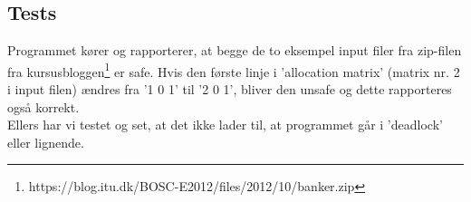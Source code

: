\subsection{Tests}
\label{O4_Tests}
Programmet kører og rapporterer, at begge de to eksempel input filer fra zip-filen fra kursusbloggen\footnote{https://blog.itu.dk/BOSC-E2012/files/2012/10/banker.zip} er safe. Hvis den første linje i 'allocation matrix' (matrix nr. 2 i  input filen) ændres fra '1 0 1' til '2 0 1', bliver den unsafe og dette rapporteres også korrekt.
\\Ellers har vi testet og set, at det ikke lader til, at programmet går i 'deadlock' eller lignende.